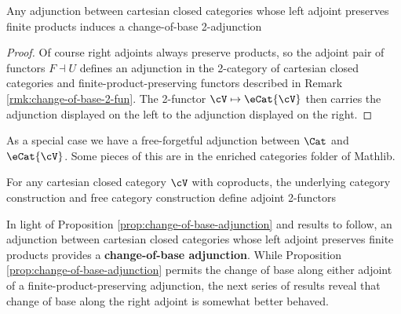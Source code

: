 \begin{proposition}\label{prop:change-of-base-adjunction}
  Any adjunction between cartesian closed categories whose left adjoint preserves finite products induces a change-of-base 2-adjunction
\begin{center}
\end{center}
\end{proposition}
\begin{proof}
Of course right adjoints always preserve products, so the adjoint pair of functors $F \dashv U$ defines an adjunction in the 2-category of cartesian closed categories and finite-product-preserving functors described in Remark \ref{rmk:change-of-base-2-fun}. The 2-functor $\cV \mapsto \eCat{\cV}$ then carries the adjunction displayed on the left to the adjunction displayed on the right.
\end{proof}

As a special case we have a free-forgetful adjunction between $\Cat$ and $\eCat{\cV}$. Some pieces of this are in the enriched categories folder of Mathlib.

\begin{corollary}\label{cor:free-underlying-2-adj}
 For any cartesian closed category $\cV$ with coproducts, the underlying category construction and free category construction define  adjoint 2-functors
\begin{center}
\end{center}
\end{corollary}


In light of Proposition \ref{prop:change-of-base-adjunction} and results to follow, an adjunction between cartesian closed categories whose left adjoint preserves finite products provides a \textbf{change-of-base adjunction}. While Proposition \ref{prop:change-of-base-adjunction} permits the change of base along either adjoint of a finite-product-preserving adjunction, the next series of results reveal that change of base along the right adjoint is somewhat better behaved.


